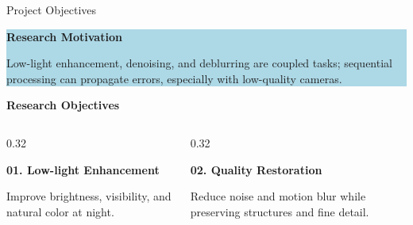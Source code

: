 \documentclass[
    11pt,%
    aspectratio=169,%
]{beamer}
\begin{document}
\begin{frame}{Project Objectives}
\small

\begin{beamercolorbox}[
    rounded=true,
    sep=0.06cm,
    wd=\textwidth
]{}
    \colorbox{LightBlue}{
        \parbox{\dimexpr\textwidth-2\fboxsep\relax}{
            {\color{Navy}\bfseries
            Research Motivation}

            \vspace{0.03cm}

            \fontsize{9}{11}\selectfont
            Low-light enhancement, denoising, and deblurring are
            coupled tasks; sequential processing can propagate errors,
            especially with low-quality cameras.
        }
    }
\end{beamercolorbox}

\vspace{0.18cm}

{\color{Navy}\bfseries Research Objectives}
\vspace{0.07cm}
\begin{columns}[T, onlytextwidth]
    \begin{column}{0.32\textwidth}
        \begin{beamercolorbox}[
            rounded=true,
            sep=0.10cm,
            wd=\linewidth
        ]{}
            {\color{orange!85!black}\bfseries 01. Low-light Enhancement}

            \vspace{0.07cm}

            \fontsize{8.5}{10}\selectfont
            Improve brightness, visibility, and natural color at night.
        \end{beamercolorbox}
    \end{column}

    \begin{column}{0.32\textwidth}
        \begin{beamercolorbox}[
            rounded=true,
            sep=0.10cm,
            wd=\linewidth
        ]{}
            {\color{orange!85!black}\bfseries 02. Quality Restoration}

            \vspace{0.07cm}

            \fontsize{8.5}{10}\selectfont
            Reduce noise and motion blur while preserving structures
            and fine detail.
        \end{beamercolorbox}
    \end{column}


\end{columns}
\end{frame}
\end{document}
